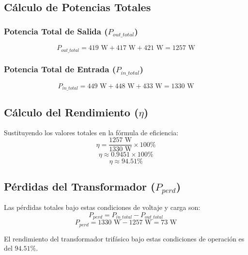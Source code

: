 \subsection{Cálculo de Potencias Totales}

\subsubsection{Potencia Total de Salida ($P_{out\_total}$)}
$$P_{out\_total} = 419 \text{ W} + 417 \text{ W} + 421 \text{ W} = 1257 \text{ W}$$

\subsubsection{Potencia Total de Entrada ($P_{in\_total}$)}
$$P_{in\_total} = 449 \text{ W} + 448 \text{ W} + 433 \text{ W} = 1330 \text{ W}$$

\subsection{Cálculo del Rendimiento ($\eta$)}

Sustituyendo los valores totales en la fórmula de eficiencia:
$$\eta = \frac{1257 \text{ W}}{1330 \text{ W}} \times 100\%$$
$$\eta \approx 0.9451 \times 100\%$$
$$\eta \approx 94.51\%$$

\subsection{Pérdidas del Transformador ($P_{perd}$)}

Las pérdidas totales bajo estas condiciones de voltaje y carga son:
$$P_{perd} = P_{in\_total} - P_{out\_total}$$
$$P_{perd} = 1330 \text{ W} - 1257 \text{ W} = 73 \text{ W}$$

El rendimiento del transformador trifásico bajo estas condiciones de operación es del $\mathbf{94.51\%}$.


